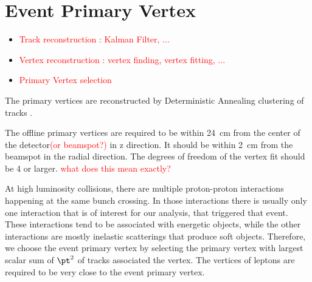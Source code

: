 %

\section{ Event Primary Vertex }
\begin{itemize}
\item \textcolor{red}{Track reconstruction : Kalman Filter, ...}
\item \textcolor{red}{Vertex reconstruction : vertex finding, vertex fitting, ...}
\item \textcolor{red}{Primary Vertex selection}
\end{itemize}

The primary vertices are reconstructed by Deterministic Annealing clustering of 
tracks \cite{davertex}.

The offline primary vertices are required to be within 24~cm from the center of the 
detector\textcolor{red}{(or beamspot?)} in z direction. 
It should be within 2~cm from the beamspot in the radial direction. 
The degrees of freedom of the vertex fit should be 4 or larger. 
\textcolor{red}{what does this mean exactly?} 

At high luminosity collisions, there are multiple proton-proton interactions 
happening at the same bunch crossing. In those interactions there is usually 
only one interaction that is of interest for our analysis, that triggered that event. 
These interactions tend to be associated with energetic objects, 
while the other interactions are mostly inelastic scatterings that produce soft objects.
Therefore, we choose the event primary vertex by selecting the primary vertex 
with largest scalar sum of $\pt^2$ of tracks associated the vertex. 
The vertices of leptons are required to be very close to the event primary vertex.  




